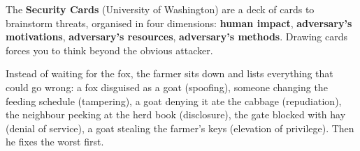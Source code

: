 \begin{defnbox}[title={Brainstorming with security cards}]
The \textbf{Security Cards} (University of Washington) are a deck of cards to brainstorm threats,
organised in four dimensions: \textbf{human impact}, \textbf{adversary's motivations},
\textbf{adversary's resources}, \textbf{adversary's methods}. Drawing cards forces you to think
beyond the obvious attacker.
\end{defnbox}

\begin{goatbox}
Instead of waiting for the fox, the farmer sits down and lists everything that could go wrong: a
fox disguised as a goat (spoofing), someone changing the feeding schedule (tampering), a goat
denying it ate the cabbage (repudiation), the neighbour peeking at the herd book (disclosure),
the gate blocked with hay (denial of service), a goat stealing the farmer's keys (elevation of
privilege). Then he fixes the worst first.
\end{goatbox}

